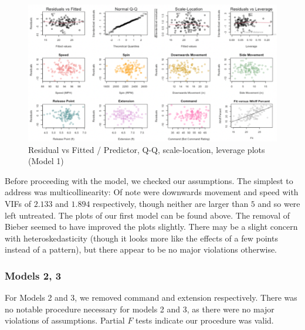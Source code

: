 \documentclass[12pt]{article}
\begin{document}
\begin{figure}[h]
    \begin{centering}
        \includegraphics[scale = 0.3]{pics/mod 1 assumptions.png}
    \caption{Residual vs Fitted / Predictor, Q-Q, scale-location, leverage plots (Model 1)}
    \end{centering}
\end{figure}

Before proceeding with the model, we checked our assumptions. The simplest to address was multicollinearity: Of note were downwards movement and speed with VIFs of $2.133$ and $1.894$ respectively, though neither are larger than $5$ and so were left untreated. The plots of our first model can be found above. The removal of Bieber seemed to have improved the plots slightly. There may be a slight concern with heteroskedasticity (though it looks more like the effects of a few points instead of a pattern), but there appear to be no major violations otherwise. 

\subsubsection{Models 2, 3}
For Models 2 and 3, we removed command and extension respectively. There was no notable procedure necessary for models 2 and 3, as there were no major violations of assumptions. Partial $F$ tests indicate our procedure was valid.
\end{document}
